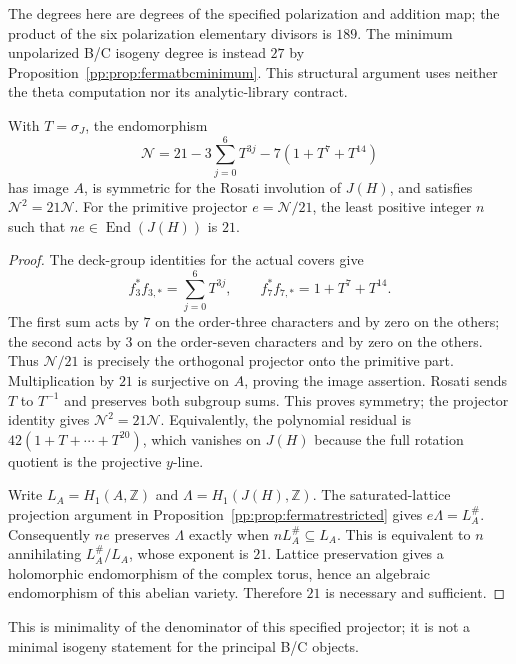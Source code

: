 The degrees here are degrees of the specified polarization and
addition map; the product of the six polarization elementary divisors
is $189$. The minimum unpolarized B/C isogeny degree is instead $27$
by Proposition~\ref{pp:prop:fermatbcminimum}. This structural argument uses neither the
theta computation nor its analytic-library contract.

\begin{corollary}
\label{pp:cor:fermatprojector}
With $T=\sigma_J$, the endomorphism
\[
 \mathcal N=21-3\sum_{j=0}^{6}T^{3j}-7(1+T^7+T^{14})
\]
has image $A$, is symmetric for the Rosati involution of $J(H)$,
and satisfies $\mathcal N^2=21\mathcal N$.
For the primitive projector $e=\mathcal N/21$, the least positive
integer $n$ such that $ne\in\operatorname{End}(J(H))$ is $21$.
\end{corollary}
\begin{proof}
The deck-group identities for the actual covers give
\[
 f_3^*f_{3,*}=\sum_{j=0}^{6}T^{3j},\qquad
 f_7^*f_{7,*}=1+T^7+T^{14}.
\]
The first sum acts by $7$ on the order-three characters and by zero
on the others; the second acts by $3$ on the order-seven characters
and by zero on the others. Thus $\mathcal N/21$ is precisely the
orthogonal projector onto the primitive part. Multiplication by $21$
is surjective on $A$, proving the image assertion. Rosati sends $T$
to $T^{-1}$ and preserves both subgroup sums. This proves symmetry;
the projector identity gives $\mathcal N^2=21\mathcal N$.
Equivalently, the polynomial residual is
$42(1+T+\cdots+T^{20})$, which vanishes on $J(H)$ because the full
rotation quotient is the projective $y$-line.

Write $L_A=H_1(A,\mathbb Z)$ and $\Lambda=H_1(J(H),\mathbb Z)$.
The saturated-lattice projection argument in
Proposition~\ref{pp:prop:fermatrestricted} gives $e\Lambda=L_A^\#$.
Consequently $ne$ preserves $\Lambda$ exactly when
$nL_A^\#\subseteq L_A$. This is equivalent to $n$ annihilating
$L_A^\#/L_A$, whose exponent is $21$. Lattice preservation gives a
holomorphic endomorphism of the complex torus, hence an algebraic
endomorphism of this abelian variety. Therefore $21$ is necessary
and sufficient.
\end{proof}

This is minimality of the denominator of this specified projector;
it is not a minimal isogeny statement for the principal B/C objects.


